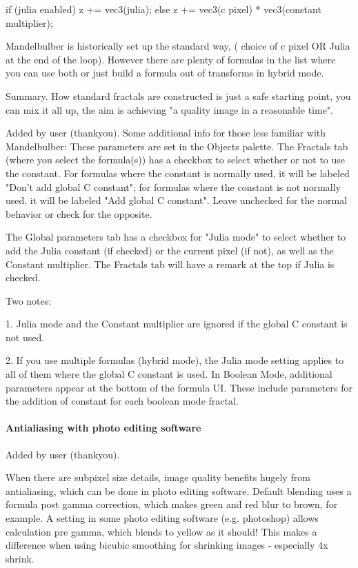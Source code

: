 if (julia enabled) z += vec3(julia);
else z += vec3(c pixel) * vec3(constant multiplier);

Mandelbulber is historically set up the standard way, ( choice of c pixel OR Julia at the end of the loop).
However there are plenty of formulas in the list where you can use both or just build a formula out of transforms in hybrid mode.

Summary. How standard fractals are constructed is just a safe starting point, you can mix it all up, the aim is achieving "a quality image in a reasonable time".


Added by user (thankyou).
 Some additional info for those less familiar with Mandelbulber: These parameters are set in the Objects palette. The Fractals tab (where you select the formula(s)) has a checkbox to select whether or not to use the constant. For formulas where the constant is normally used, it will be labeled "Don't add global C constant"; for formulas where the constant is not normally used, it will be labeled "Add global C constant". Leave unchecked for the normal behavior or check for the opposite.

The Global parameters tab has a checkbox for "Julia mode" to select whether to add the Julia constant (if checked) or the current pixel (if not), as well as the Constant multiplier. The Fractals tab will have a remark at the top if Julia is checked.

Two notes:

1. Julia mode and the Constant multiplier are ignored if the global C constant is not used.

2. If you use multiple formulas (hybrid mode), the Julia mode setting applies to all of them where the global C constant is used. In Boolean Mode, additional parameters appear at the bottom of the formula UI. These include parameters for the addition of constant for each boolean mode fractal.


\paragraph{Antialiasing with photo editing software}
Added by user (thankyou).

When there are subpixel size details, image quality benefits hugely from antialiasing, which can be done in photo editing software. Default blending uses a formula post gamma correction, which makes green and red blur to brown, for example. A setting in some photo editing software (e.g. photoshop) allows calculation pre gamma, which blends to yellow as it should! This makes a difference when using bicubic smoothing for shrinking images - especially 4x shrink.

